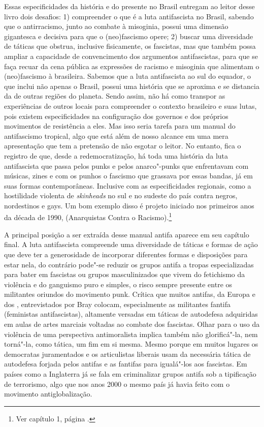 Essas especificidades da história e do presente no Brasil entregam ao
leitor desse livro dois desafios: 1) compreender o que é a luta
antifascista no Brasil, sabendo que o antirracismo, junto ao combate à
misoginia, possui uma dimensão gigantesca e decisiva para que o
(neo)fascismo opere; 2) buscar uma diversidade de táticas que obstrua,
inclusive fisicamente, os fascistas, mas que também possa ampliar a
capacidade de convencimento dos argumentos antifascistas, para que se
faça recuar da cena pública as expressões de racismo e misoginia que
alimentam o (neo)fascismo à brasileira. Sabemos que a luta antifascista
ao sul do equador, o que inclui não apenas o Brasil, possui uma história
que se aproxima e se distancia da de outras regiões do planeta. Sendo
assim, não há como transpor as experiências de outros locais para
compreender o contexto brasileiro e suas lutas, pois existem
especificidades na configuração dos governos e dos próprios movimentos
de resistência a eles. Mas isso seria tarefa para um manual do
antifascismo tropical, algo que está além de nosso alcance em uma mera
apresentação que tem a pretensão de não esgotar o leitor. No entanto,
fica o registro de que, desde a redemocratização, há toda uma história
da luta antifascista que passa pelos punks e pelos anarco"-punks que
enfrentavam com músicas, zines e com os punhos o fascismo que grassava
por essas bandas, já em suas formas contemporâneas. Inclusive com as
especificidades regionais, como a hostilidade violenta de
\emph{skinheads} no sul e no sudeste do país contra negros, nordestinos
e gays. Um bom exemplo disso é projeto iniciado nos primeiros anos da
década de 1990,  (Anarquistas Contra o Racismo).\footnote{Ver capítulo 1, página \pageref{acr}.}

A principal posição a ser extraída desse manual antifa aparece em seu
capítulo final. A luta antifascista compreende uma diversidade de
táticas e formas de ação que deve ter a generosidade de incorporar
diferentes formas e disposições para estar nela, do contrário pode"-se
reduzir os grupos antifa a tropas especializadas para bater em fascistas
ou grupos masculinizados que vivem do fetichismo da violência e do
ganguismo puro e simples, o risco sempre presente entre os militantes
oriundos do movimento punk. Crítica que muitos antifas, da Europa e dos
, entrevistados por Bray colocam, especialmente as militantes fantifa
(feministas antifascistas), altamente versadas em táticas de autodefesa
adquiridas em aulas de artes marciais voltadas ao combate dos fascistas.
Olhar para o uso da violência de uma perspectiva antimoralista implica
também não glorificá"-la, nem torná"-la, como tática, um fim em si mesma.
Mesmo porque em muitos lugares os democratas juramentados e os
articulistas liberais usam da necessária tática de autodefesa forjada
pelos antifas e as fantifas para igualá"-los aos fascistas. Em países
como a Inglaterra já se fala em criminalizar grupos antifa sob a
tipificação de terrorismo, algo que nos anos 2000 o mesmo país já havia
feito com o movimento antiglobalização.

